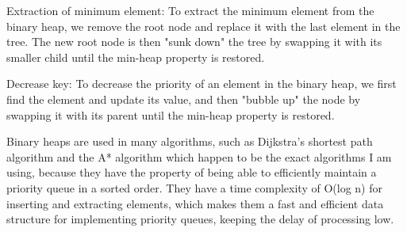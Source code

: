 \begin{FlushLeft}
    Extraction of minimum element: To extract the minimum element from the binary heap, we remove the root node and replace it with the last element in the tree. The new root node is then "sunk down" the tree by swapping it with its smaller child until the min-heap property is restored.\\ \bk
    
    Decrease key: To decrease the priority of an element in the binary heap, we first find the element and update its value, and then "bubble up" the node by swapping it with its parent until the min-heap property is restored.\\ \bk
    
    Binary heaps are used in many algorithms, such as Dijkstra's shortest path algorithm and the A* algorithm which happen to be the exact algorithms I am using, because they have the property of being able to efficiently maintain a priority queue in a sorted order. They have a time complexity of O(log n) for inserting and extracting elements, which makes them a fast and efficient data structure for implementing priority queues, keeping the delay of processing low.\\ \bk

    \bk
\end{FlushLeft}